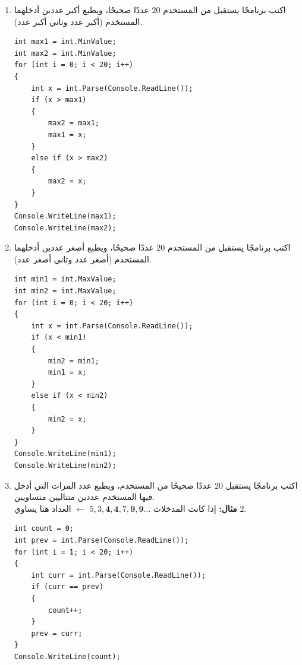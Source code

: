 \documentclass[14pt]{extarticle}
\begin{document}
\begin{enumerate}[resume, itemsep=2em]
\item اكتب برنامجًا يستقبل من المستخدم $20$ عددًا صحيحًا، ويطبع أكبر عددين أدخلهما المستخدم (أكبر عدد وثاني أكبر عدد).
\ifwithsols
\begin{boxSolution}
\begin{english}
\begin{verbatim}
int max1 = int.MinValue;
int max2 = int.MinValue;
for (int i = 0; i < 20; i++)
{
    int x = int.Parse(Console.ReadLine());
    if (x > max1)
    {
        max2 = max1;
        max1 = x;
    }
    else if (x > max2)
    {
        max2 = x;
    }
}
Console.WriteLine(max1);
Console.WriteLine(max2);
\end{verbatim}
\end{english}
\end{boxSolution}
\fi
\filbreak

\item اكتب برنامجًا يستقبل من المستخدم $20$ عددًا صحيحًا، ويطبع أصغر عددين أدخلهما المستخدم (أصغر عدد وثاني أصغر عدد).
\ifwithsols
\begin{boxSolution}
\begin{english}
\begin{verbatim}
int min1 = int.MaxValue;
int min2 = int.MaxValue;
for (int i = 0; i < 20; i++)
{
    int x = int.Parse(Console.ReadLine());
    if (x < min1)
    {
        min2 = min1;
        min1 = x;
    }
    else if (x < min2)
    {
        min2 = x;
    }
}
Console.WriteLine(min1);
Console.WriteLine(min2);
\end{verbatim}
\end{english}
\end{boxSolution}
\fi
\filbreak

\item اكتب برنامجًا يستقبل $20$ عددًا صحيحًا من المستخدم، ويطبع عدد المرات التي أدخل فيها المستخدم عددين متتاليين متساويين. \\
\textbf{مثال:} إذا كانت المدخلات $5, 3, \mathbf{4, 4}, 7, \mathbf{9, 9} \dots$ $\leftarrow$ العداد هنا يساوي $2$.
\ifwithsols
\begin{boxSolution}
\begin{english}
\begin{verbatim}
int count = 0;
int prev = int.Parse(Console.ReadLine());
for (int i = 1; i < 20; i++)
{
    int curr = int.Parse(Console.ReadLine());
    if (curr == prev)
    {
        count++;
    }
    prev = curr;
}
Console.WriteLine(count);
\end{verbatim}
\end{english}
\end{boxSolution}
\fi
\filbreak


\end{enumerate}
\end{document}
